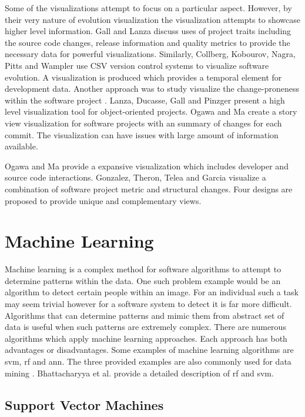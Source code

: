 Some of the visualizations attempt to focus on a particular aspect. However, by their very nature of evolution visualization the visualization attempts to showcase higher level information. Gall and Lanza discuss uses of project traits including the source code changes, release information and quality metrics to provide the necessary data for powerful visualizations. Similarly, Collberg, Kobourov, Nagra, Pitts and Wampler use CSV version control systems to visualize software evolution. A visualization is produced which provides a temporal element for development data. Another approach was to study visualize the change-proneness within the software project \cite{Bieman2003a}. Lanza, Ducasse, Gall and Pinzger present a high level visualization tool for object-oriented projects. Ogawa and Ma create a story view visualization for software projects with an summary of changes for each commit. The visualization can have issues with large amount of information available.

Ogawa and Ma provide a expansive visualization which includes developer and source code interactions. Gonzalez, Theron, Telea and Garcia visualize a combination of software project metric and structural changes. Four designs are proposed to provide unique and complementary views. 

\section{Machine Learning}

Machine learning is a complex method for software algorithms to attempt to determine patterns within the data. One such problem example would be an algorithm to detect certain people within an image. For an individual such a task may seem trivial however for a software system to detect it is far more difficult. Algorithms that can determine patterns and mimic them from abstract set of data is useful when such patterns are extremely complex. There are numerous algorithms which apply machine learning approaches. Each approach has both advantages or disadvantages. Some examples of machine learning algorithms are \gls{svm}, \gls{rf} and \gls{ann}. The three provided examples are also commonly used for data mining \cite{Alam2013, Westland2011, Granitto2007, Huang2007, Jalbert2012, Yu2011}. Bhattacharyya et al. provide a detailed description of \gls{rf} and \gls{svm}.

\subsection{Support Vector Machines}
\label{subsec:svm_prediction}

